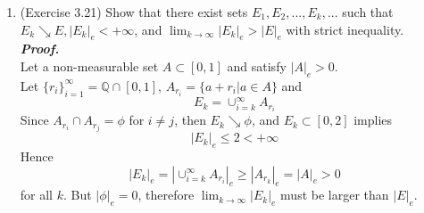 \documentclass[a4paper,11pt]{article}
\begin{document}
\begin{enumerate}
\item (Exercise 3.21) Show that there exist sets $E_1, E_2,...,E_k,...$ such that $E_k \searrow E, |E_k|_e < +\infty$, and $\lim_{k \to \infty} |E_k|_e > |E|_e$ with strict inequality.\\
\newline
\textit{\textbf {Proof.}}\\
Let a non-measurable set $A \subset [0,1]$ and satisfy $|A|_e > 0$.\\
Let $\{ r_i \}_{i=1}^{\infty} = \mathbb{Q} \cap [0,1]$, $A_{r_i} = \{ a + r_i | a \in A \}$ and
$$E_k = \cup_{i=k}^{\infty} A_{r_i}$$
Since $A_{r_i} \cap A_{r_j} = \phi$ for $i \neq j$, then $E_k \searrow \phi$, and $E_k \subset [0,2]$ implies
$$|E_k|_e \leq 2 < +\infty$$
Hence
$$|E_k|_e = |\cup_{i=k}^{\infty} A_{r_i}|_e \geq |A_{r_k}|_e = |A|_e > 0$$
for all $k$.
But $|\phi|_e = 0$, therefore $\lim_{k \to \infty}|E_k|_e$ must be larger than $|E|_e$.
\newline




\end{enumerate}
\end{document}
